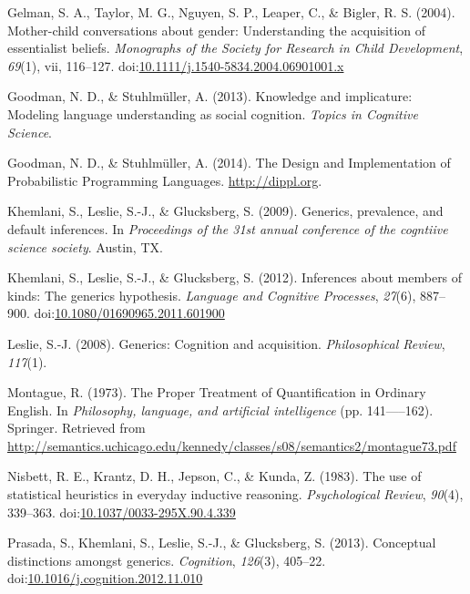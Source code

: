 \documentclass[,man,floatsintext]{apa6}
\theoremstyle{definition}
\theoremstyle{definition}
\theoremstyle{definition}
\theoremstyle{remark}
\begin{document}
\leavevmode\hypertarget{ref-GelmanEtAl2004}{}%
Gelman, S. A., Taylor, M. G., Nguyen, S. P., Leaper, C., \& Bigler, R.
S. (2004). Mother-child conversations about gender: Understanding the
acquisition of essentialist beliefs. \emph{Monographs of the Society for
Research in Child Development}, \emph{69}(1), vii, 116--127.
doi:\href{https://doi.org/10.1111/j.1540-5834.2004.06901001.x}{10.1111/j.1540-5834.2004.06901001.x}

\leavevmode\hypertarget{ref-Goodman2013}{}%
Goodman, N. D., \& Stuhlmüller, A. (2013). Knowledge and implicature:
Modeling language understanding as social cognition. \emph{Topics in
Cognitive Science}.

\leavevmode\hypertarget{ref-dippl}{}%
Goodman, N. D., \& Stuhlmüller, A. (2014). The Design and Implementation
of Probabilistic Programming Languages. \url{http://dippl.org}.

\leavevmode\hypertarget{ref-Khemlani2009}{}%
Khemlani, S., Leslie, S.-J., \& Glucksberg, S. (2009). Generics,
prevalence, and default inferences. In \emph{Proceedings of the 31st
annual conference of the cogntiive science society}. Austin, TX.

\leavevmode\hypertarget{ref-Khemlani2012}{}%
Khemlani, S., Leslie, S.-J., \& Glucksberg, S. (2012). Inferences about
members of kinds: The generics hypothesis. \emph{Language and Cognitive
Processes}, \emph{27}(6), 887--900.
doi:\href{https://doi.org/10.1080/01690965.2011.601900}{10.1080/01690965.2011.601900}

\leavevmode\hypertarget{ref-Leslie2008}{}%
Leslie, S.-J. (2008). Generics: Cognition and acquisition.
\emph{Philosophical Review}, \emph{117}(1).

\leavevmode\hypertarget{ref-Montague1973}{}%
Montague, R. (1973). The Proper Treatment of Quantification in Ordinary
English. In \emph{Philosophy, language, and artificial intelligence}
(pp. 141-----162). Springer. Retrieved from
\url{http://semantics.uchicago.edu/kennedy/classes/s08/semantics2/montague73.pdf}

\leavevmode\hypertarget{ref-Nisbett1983}{}%
Nisbett, R. E., Krantz, D. H., Jepson, C., \& Kunda, Z. (1983). The use
of statistical heuristics in everyday inductive reasoning.
\emph{Psychological Review}, \emph{90}(4), 339--363.
doi:\href{https://doi.org/10.1037/0033-295X.90.4.339}{10.1037/0033-295X.90.4.339}

\leavevmode\hypertarget{ref-Prasada2013}{}%
Prasada, S., Khemlani, S., Leslie, S.-J., \& Glucksberg, S. (2013).
Conceptual distinctions amongst generics. \emph{Cognition},
\emph{126}(3), 405--22.
doi:\href{https://doi.org/10.1016/j.cognition.2012.11.010}{10.1016/j.cognition.2012.11.010}
\end{document}
